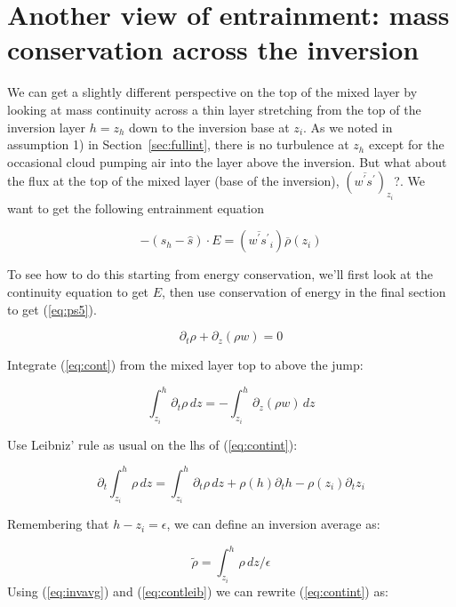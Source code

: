 \documentclass[12pt]{article}
\begin{document}
\section{Another view of entrainment: mass conservation across the inversion}
\label{sec:anoth-view-entr}

We can get a slightly different perspective on the top of the mixed
layer by looking at mass continuity across a thin layer
stretching from the top of the inversion layer $h=z_h$ down to the inversion base at $z_i$.
As we noted in assumption 1) in Section~\ref{sec:fullint}, there is no
turbulence at $z_h$ except for the occasional cloud pumping air into
the layer above the inversion.  But what about the flux at the top of the mixed layer
(base of the inversion),
$(\overline{w^\prime s^\prime})_{z_i}$?.  We want to get the following entrainment equation

\begin{equation}
  \label{eq:ps5}
  - (s_h - \hat{s}) \cdot E = \left ( \overline{w^\prime s^\prime}_i \right ) \overline{\rho}(z_i)
\end{equation}

To see how to do this starting from energy conservation, we'll first look at the continuity
equation to get $E$, then use conservation of energy in the final section to get (\ref{eq:ps5}).

\begin{equation}
  \label{eq:cont}
  \partial_t \rho + \partial_z (\rho w) = 0
\end{equation}

Integrate (\ref{eq:cont}) from the mixed layer top to above the jump:

\begin{equation}
  \label{eq:contint}
  \int_{z_i}^{h} \! \partial_t \rho  \,dz = - \int_{z_i}^{h}\! \partial_z (\rho w) \,dz
\end{equation}

Use Leibniz' rule as usual on the lhs of (\ref{eq:contint}):

\begin{equation}
  \label{eq:contleib}
 \partial_t \int_{z_i}^{h} \!  \rho  \,dz = \int_{z_i}^{h} \! \partial_t \rho  \,dz + \rho(h) \partial_t h
 - \rho(z_i) \partial_t z_i
\end{equation}

Remembering that $h - z_i = \epsilon$, we can define an inversion average as:

\begin{equation}
  \label{eq:invavg}
  \widetilde{\rho} = \int_{z_i}^{h} \!  \rho  \,dz / \epsilon
\end{equation}
Using (\ref{eq:invavg}) and (\ref{eq:contleib}) we can rewrite (\ref{eq:contint}) as:
\end{document}
